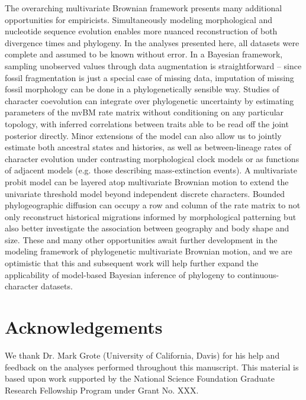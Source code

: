 \documentclass[10pt, twocolumn, twoside]{article}
\begin{document}
The overarching multivariate Brownian framework presents many additional opportunities for empiricists. Simultaneously modeling morphological and nucleotide sequence evolution enables more nuanced reconstruction of both divergence times and phylogeny. In the analyses presented here, all datasets were complete and assumed to be known without error. In a Bayesian framework, sampling unobserved values through data augmentation is straightforward – since fossil fragmentation is just a special case of missing data, imputation of missing fossil morphology can be done in a phylogenetically sensible way.  Studies of character coevolution can integrate over phylogenetic uncertainty by estimating parameters of the mvBM rate matrix without conditioning on any particular topology, with inferred correlations between traits able to be read off the joint posterior directly. Minor extensions of the model can also allow us to jointly estimate both ancestral states and histories, as well as between-lineage rates of character evolution under contrasting morphological clock models or as functions of adjacent models (e.g. those describing mass-extinction events). A multivariate probit model can be layered atop multivariate Brownian motion to extend the univariate threshold model \citep[e.g. ][]{felsensteinUsingQuantitativeGenetic2005, felsensteinComparativeMethodBoth2012, revellAncestralCharacterEstimation2014a} beyond independent discrete characters. Bounded phylogeographic diffusion can occupy a row and column of the rate matrix to not only reconstruct historical migrations informed by morphological patterning but also better investigate the association between geography and body shape and size. These and many other opportunities await further development in the modeling framework of phylogenetic multivariate Brownian motion, and we are optimistic that this and subsequent work will help further expand the applicability of model-based Bayesian inference of phylogeny to continuous-character datasets.

\clearpage


\section*{Acknowledgements}

We thank Dr. Mark Grote (University of California, Davis) for his help and feedback on the analyses performed throughout this manuscript. This material is based upon work supported by the National Science Foundation Graduate Research Fellowship Program under Grant No. XXX.
\end{document}
